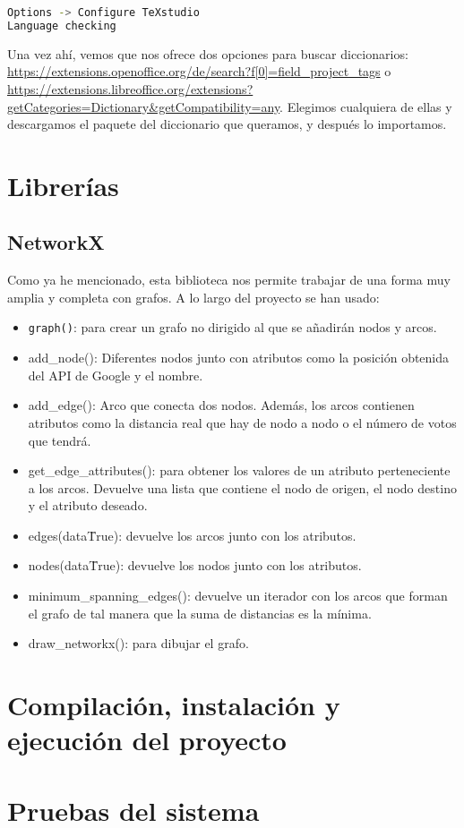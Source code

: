 \begin{lstlisting}[language=bash,caption={Añadir diccionario}]
Options -> Configure TeXstudio
Language checking
\end{lstlisting}

Una vez ahí, vemos que nos ofrece dos opciones para buscar diccionarios: \url{https://extensions.openoffice.org/de/search?f[0]=field_project_tags} o \url{https://extensions.libreoffice.org/extensions?getCategories=Dictionary&getCompatibility=any}. Elegimos cualquiera de ellas y descargamos el paquete del diccionario que queramos, y después lo importamos.


\section{Librerías}

\subsection{NetworkX}
Como ya he mencionado, esta biblioteca nos permite trabajar de una forma muy amplia y completa con grafos. A lo largo del proyecto se han usado:
\begin{itemize}
	\item \texttt{graph()}: para crear un grafo no dirigido al que se añadirán nodos y arcos.
	\item add\_node(): Diferentes nodos junto con atributos como la posición obtenida del API de Google y el nombre.
	\item add\_edge(): Arco que conecta dos nodos. Además, los arcos contienen atributos como la distancia real que hay de nodo a nodo o el número de votos que tendrá.
	\item get\_edge\_attributes(): para obtener los valores de un atributo perteneciente a los arcos. Devuelve una lista que contiene el nodo de origen, el nodo destino y el atributo deseado.
	\item edges(data\=True): devuelve los arcos junto con los atributos.
	\item nodes(data\=True): devuelve los nodos junto con los atributos.
	\item minimum\_spanning\_edges(): devuelve un iterador con los arcos que forman el grafo de tal manera que la suma de distancias es la mínima.
	\item draw\_networkx(): para dibujar el grafo.
\end{itemize}





\section{Compilación, instalación y ejecución del proyecto}


\section{Pruebas del sistema}
